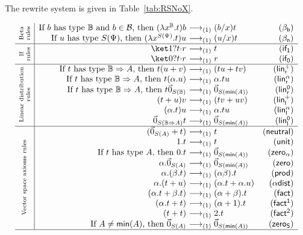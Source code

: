 \documentclass[preprint]{elsarticle}
\newcommand\titulo[3][\scriptsize]{\rotatebox[origin=c]{90}{\parbox[t]{#2}{\centering #1{#3}}}}
\newcommand\lra[1][1]{\longrightarrow_{\left(#1\right)}}
\newcommand\B{\ensuremath{\mathbb B}}
\newcommand\gB{\ensuremath{\Psi}}
\newcommand\ite[3]{{#1}?{#2}\mathord{\cdot}{#3}}
\newcommand\pair[2]{({#1}+{#2})}
\newcommand\basis{\ensuremath{\mathcal B}}
\newcommand\s[1]{\ensuremath{\mathsf{#1}}}
\newcommand\z[1][A]{\vec 0_{S(#1)}}
\newcommand\rbetab{(\s{\beta_b})}
\newcommand\rbetan{(\s{\beta_n})}
\newcommand\riftrue{(\s{if_{1}})}
\newcommand\riffalse{(\s{if_{0}})}
\newcommand\rlinr{(\s{lin^+_r})}
\newcommand\rlinscalr{(\s{lin^\alpha_r})}
\newcommand\rlinzr{(\s{lin^0_r})}
\newcommand\rlinl{(\s{lin^+_l})}
\newcommand\rlinscall{(\s{lin^\alpha_l})}
\newcommand\rlinzl{(\s{lin^0_l})}
\newcommand\rneut{(\s{neutral})}
\newcommand\runit{(\s{unit})}
\newcommand\rzeros{(\s{zero_\alpha})}
\newcommand\rzero{(\s{zero})}
\newcommand\rzeroS{(\s{zero_S})}
\newcommand\rprod{(\s{prod})}
\newcommand\rdists{(\s{\alpha dist})}
\newcommand\rfact{(\s{fact})}
\newcommand\rfacto{(\s{fact^1})}
\newcommand\rfactt{(\s{fact^2})}
\begin{document}
The rewrite system is given in Table~\ref{tab:RSNoX}.
\begin{table}
  \vspace{-3mm}
  \[
    \begin{array}{c|r@{\ }lr}
      \multirow{2}{*}{\titulo{8.4mm}{Beta rules}}
      & \textrm{If $b$ has type $\B$ and $b\in\basis$, then } (\lambda x^\B.t)b &\lra (b/x)t & \rbetab\\
      & \textrm{If $u$ has type $S(\gB)$, then } (\lambda x^{S(\gB)}.t)u &\lra (u/x)t & \rbetan\\\hline
      \multirow{2}{*}{\titulo{8.4mm}{If rules}}
      &\ite{\ket 1}tr &\lra t &\riftrue\\
      &\ite{\ket 0}tr &\lra r &\riffalse\\\hline
      \multirow{6}{*}{\titulo{25.2mm}{Linear distribution rules}}
      &\textrm{If $t$ has type $\B\Rightarrow A$, then } t\pair uv &\lra \pair{tu}{tv} & \rlinr\\
      &\textrm{If $t$ has type $\B\Rightarrow A$, then } t(\alpha.u) &\lra\alpha.tu & \rlinscalr\\
      &\textrm{If $t$ has type $\B\Rightarrow A$, then } t\z[\B] &\lra\z[\mathsf{min}(A)] &\rlinzr\\
      &\pair tuv &\lra\pair{tv}{uv} & \rlinl\\
      &(\alpha.t)u &\lra\alpha.tu &\rlinscall\\
      &\z[\B\Rightarrow A]t &\lra\z[\mathsf{min}(A)] &\rlinzl\\\hline
      \multirow{10}{*}{\titulo{37.8mm}{Vector space axioms rules}}
      &\pair\z t &\lra t &\rneut\\
      &1.t &\lra t &\runit\\
      &\textrm{If $t$ has type $A$, then }0.t &\lra\z[\mathsf{min}(A)] &\rzeros\\
      &\alpha.\z &\lra\z[\mathsf{min}(A)] &\rzero\\
      &\alpha.(\beta.t) &\lra (\alpha\beta).t &\rprod\\
      &\alpha.\pair tu &\lra\pair{\alpha.t}{\alpha.u} &\rdists\\
      &\pair{\alpha.t}{\beta.t} &\lra(\alpha+\beta).t &\rfact\\
      &\pair{\alpha.t}t &\lra (\alpha+1).t &\rfacto\\
      &\pair tt &\lra 2.t &\rfactt\\
      &\textrm{If $A\neq\mathsf{min}(A)$, then }\z &\lra\z[\mathsf{min}(A)] & \rzeroS \\\hline

\end{array}\]
\end{table}
\end{document}
